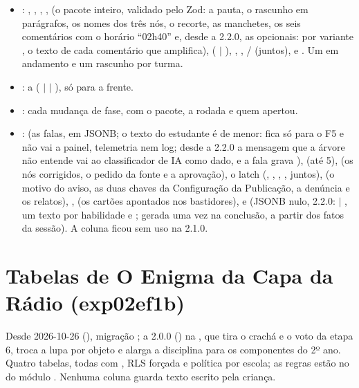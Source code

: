 \begin{itemize}
  \item {}: , , ,
    ,  (o pacote inteiro, validado pelo Zod:
    a pauta, o rascunho em parágrafos, os nomes dos três nós, o recorte, as
    manchetes, os seis comentários com o horário \enquote{02h40} e, desde a
    2.2.0, as  opcionais: por variante , o
    texto de cada comentário que amplifica),
     ( $|$ ), , ,
    / (juntos),  e
    . Um em andamento e um rascunho por turma.
  \item {}: a  ( $|$
     $|$ ), só para a frente.
  \item {}: cada mudança de fase, com o pacote,
    a rodada e quem apertou.
  \item {}:  (as falas, em JSONB; o texto
    do estudante é de menor: fica só para o F5 e não vai a painel,
    telemetria nem log; desde a 2.2.0 a mensagem que a árvore não entende vai
    ao classificador de IA como dado, e a fala grava ),
     (até 5),  (os nós corrigidos, o
    pedido da fonte e a aprovação), o latch (,
    , , , juntos),
     (o motivo do aviso, as duas chaves da Configuração da
    Publicação, a denúncia e os relatos), , 
    (os cartões apontados nos bastidores),  e
     (JSONB nulo, 2.2.0:   $|$
    , um texto por habilidade e ; gerada uma vez na
    conclusão, a partir dos fatos da sessão). A coluna
     ficou sem uso na 2.1.0.
\end{itemize}

\section{Tabelas de O Enigma da Capa da Rádio (exp02ef1b)}
\label{sec:dicionario-exp02ef1b}

Desde 2026-10-26 (), migração
; a 2.0.0
() na , que tira o
crachá e o voto da etapa 6, troca a lupa por objeto e alarga a disciplina para
os componentes do 2º ano. Quatro tabelas, todas
com  , RLS forçada e política por escola; as
regras estão no  do módulo . Nenhuma coluna
guarda texto escrito pela criança.

